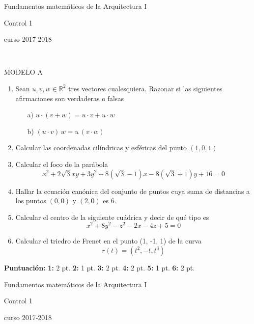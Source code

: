 \documentclass[a4paper, 12pt]{article}
\newcommand{\R}{\mathbb R}
\begin{document}
\pagestyle {empty}
\begin{center}
\LARGE
Fundamentos matemáticos de la Arquitectura I

\Large
Control 1

\large
curso 2017-2018
\end{center}

\

\large

MODELO A
\vskip 5mm
\begin{enumerate}
\item
Sean $u,v,w\in \R^2$ tres vectores cualesquiera. Razonar si las siguientes afirmaciones son verdaderas o falsas
\begin{itemize}
\item[a)]
$u\cdot(v+w)=u\cdot v+ u\cdot w$
\item[b)]
$(u\cdot v)\,w=u\,(v\cdot w)$
\end{itemize}
\vskip 15mm


\item
Calcular las coordenadas cilíndricas y esféricas del punto $(1, 0, 1)$
\vskip 15mm
 
 
\item
Calcular el foco de la parábola
$$
x^2 + 2\sqrt{3} xy +3 y^2 + 8(\sqrt{3}-1)x -8(\sqrt{3}+1)y +16 = 0
$$
\vskip 15mm


\item
Hallar la ecuación canónica del conjunto de puntos cuya suma de distancias a los puntos $(0,0)$ y $(2,0)$ es $6$.
\vskip 15mm


\item
Calcular el centro de la siguiente cuádrica y decir de qué tipo es
$$
x^2+8y^2-z^2-2x-4z+5=0
$$
\vskip 15mm


\item Calcular el triedro de Frenet en el punto (1, -1, 1) de la curva
$$
r(t)=(t^2, -t, t^3)
$$

\end{enumerate}

\vskip 17mm
\normalsize
\noindent
{\bf Puntuación:}
\hskip 5mm
{\bf 1:} 2 pt. \hskip 8mm 
{\bf 2:} 1 pt. \hskip 8mm
{\bf 3:} 2 pt. \hskip 8mm
{\bf 4:} 2 pt. \hskip 8mm
{\bf 5:} 1 pt. \hskip 8mm
{\bf 6:} 2 pt.


\pagebreak


\begin{center}
\LARGE
Fundamentos matemáticos de la Arquitectura I

\Large
Control 1

\large
curso 2017-2018
\end{center}
\end{document}
